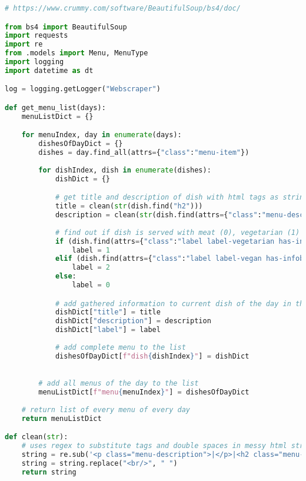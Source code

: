 \begin{lstlisting}[language=Python]
# https://www.crummy.com/software/BeautifulSoup/bs4/doc/

from bs4 import BeautifulSoup
import requests
import re
from .models import Menu, MenuType
import logging
import datetime as dt

log = logging.getLogger("Webscraper")

def get_menu_list(days):
    menuListDict = {}

    for menuIndex, day in enumerate(days):
        dishesOfDayDict = {}
        dishes = day.find_all(attrs={"class":"menu-item"})
        
        for dishIndex, dish in enumerate(dishes):
            dishDict = {}

            # get title and description of dish with html tags as strings and using the "clean()" function to remove tags and double spaces
            title = clean(str(dish.find("h2")))
            description = clean(str(dish.find(attrs={"class":"menu-description"})))
            
            # find out if dish is served with meat (0), vegetarian (1) or vegan (2)
            if (dish.find(attrs={"class":"label label-vegetarian has-infobox"}) is not None):
                label = 1
            elif (dish.find(attrs={"class":"label label-vegan has-infobox"}) is not None):
                label = 2
            else:
                label = 0

            # add gathered information to current dish of the day in the list
            dishDict["title"] = title
            dishDict["description"] = description
            dishDict["label"] = label
            
            # add complete menu to the list
            dishesOfDayDict[f"dish{dishIndex}"] = dishDict

        
        # add all menus of the day to the list
        menuListDict[f"menu{menuIndex}"] = dishesOfDayDict
    
    # return list of every menu of every day
    return menuListDict

def clean(str):
    # uses regex to substitute tags and double spaces in messy html string with empty strings or single spaces
    string = re.sub('<p class="menu-description">|</p>|<h2 class="menu-title">|</h2>|\\xad\s*|\\n', '', str)
    string = string.replace("<br/>", " ")
    return string


\end{lstlisting}
